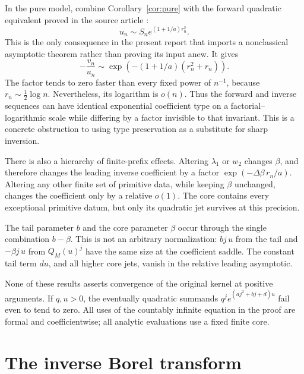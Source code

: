 \documentclass[11pt,a4paper]{article}
\numberwithin{equation}{section}
\theoremstyle{definition}\newtheorem{definition}[theorem]{Definition}
\theoremstyle{remark}\newtheorem{remark}[theorem]{Remark}
\theoremstyle{definition}
\begin{document}
In the pure model, combine Corollary~\ref{cor:pure} with the forward
quadratic equivalent proved in the source article \cite{finitecore}:
\begin{equation}
 u_n\sim S_n e^{(1+1/a)r_n^2}.
 \label{eq:forwardimport}
\end{equation}
This is the only consequence in the present report that imports a
nonclassical asymptotic theorem rather than proving its input anew.
It gives
\begin{equation}
 \boxed{\displaystyle
 -\frac{v_n}{u_n}\sim
 \exp\!\left(-(1+1/a)(r_n^2+r_n)\right).}
 \label{eq:cancellation}
\end{equation}
The factor tends to zero faster than every fixed power of \(n^{-1}\),
because \(r_n\sim\frac12\log n\). Nevertheless, its logarithm is \(o(n)\).
Thus the forward and inverse sequences can have identical exponential
coefficient type on a factorial--logarithmic scale while differing by a
factor invisible to that invariant. This is a concrete obstruction to
using type preservation as a substitute for sharp inversion.

There is also a hierarchy of finite-prefix effects. Altering \(\lambda_1\)
or \(w_2\) changes \(\beta\), and therefore changes the leading inverse
coefficient by a factor \(\exp(-\Delta\beta\,r_n/a)\). Altering any other
finite set of primitive data, while keeping \(\beta\) unchanged, changes the
coefficient only by a relative \(o(1)\). The core contains every exceptional
primitive datum, but only its quadratic jet survives at this precision.

The tail parameter \(b\) and the core parameter \(\beta\) occur through the
single combination \(b-\beta\). This is not an arbitrary normalization:
\(bj\,u\) from the tail and \(-\beta j\,u\) from \(Q_M(u)^j\) have the
same size at the coefficient saddle. The constant tail term \(du\), and
all higher core jets, vanish in the relative leading asymptotic.

None of these results asserts convergence of the original kernel at
positive arguments. If \(q,u>0\), the eventually quadratic summands
\(q^j e^{(aj^2+bj+d)u}\) fail even to tend to zero. All uses of the
countably infinite equation in the proof are formal and coefficientwise;
all analytic evaluations use a fixed finite core.

\section{The inverse Borel transform}
\label{sec:borel}
\end{document}
